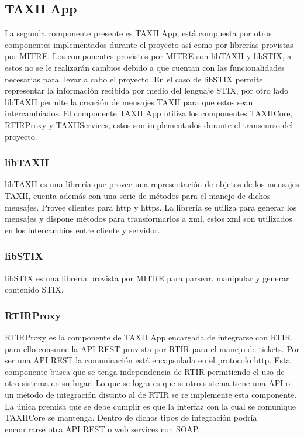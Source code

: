 	
	\bigskip
	
	\subsection{TAXII App}
	
	\bigskip
	
	La segunda componente presente es TAXII App, está compuesta por otros componentes
		implementados durante el proyecto así como por librerías provistas por MITRE. Los componentes provistos por MITRE son
		libTAXII y libSTIX, a estos no se le realizarán cambios debido a que cuentan con las funcionalidades necesarias para
		llevar a cabo el proyecto. En el caso de libSTIX permite representar la información recibida por medio del lenguaje
		STIX, por otro lado libTAXII permite la creación de mensajes TAXII para que estos sean intercambiados. El componente
		TAXII App utiliza los componentes TAXIICore, RTIRProxy y TAXIIServices, estos son implementados durante el transcurso
		del proyecto.
	
	\subsubsection{libTAXII}
	libTAXII \cite{libtaxii} es una librería que provee una representación de objetos de los mensajes TAXII, cuenta además
		con una serie de métodos para el manejo de dichos mensajes. Provee clientes para http y https. La librería se utiliza
		para generar los mensajes y dispone métodos para transformarlos a xml, estos xml son utilizados en los intercambios
		entre cliente y servidor.
	
	\subsubsection{libSTIX}
	libSTIX es una librería provista por MITRE para parsear, manipular y generar contenido STIX.
	
	\subsubsection{RTIRProxy}
	RTIRProxy es la componente de TAXII App encargada de integrarse con RTIR, para ello consume la
		API REST provista por RTIR para el manejo de tickets. Por ser una API REST la comunicación está encapsulada en el
		protocolo http. Esta componente busca que se tenga independencia de RTIR permitiendo el uso de otro sistema en su
		lugar. Lo que se logra es que si otro sistema tiene una API
		o un método de integración distinto al de RTIR se re implemente esta componente. La única premisa que se debe cumplir
		es que la interfaz con la cual se comunique TAXIICore se mantenga. Dentro de dichos tipos de integración podría
		encontrarse otra API REST o web services con SOAP.
	
